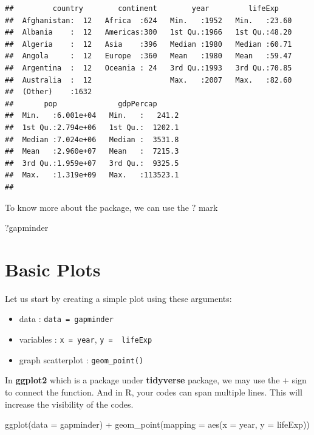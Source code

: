 \documentclass[
  10pt,
]{krantz}
\newenvironment{Shaded}{\begin{snugshade}}{\end{snugshade}}
\newcommand{\AttributeTok}[1]{\textcolor[rgb]{0.77,0.63,0.00}{#1}}
\newcommand{\FunctionTok}[1]{\textcolor[rgb]{0.00,0.00,0.00}{#1}}
\newcommand{\NormalTok}[1]{#1}
\newcommand{\SpecialCharTok}[1]{\textcolor[rgb]{0.00,0.00,0.00}{#1}}
\providecommand{\tightlist}{%
  \setlength{\itemsep}{0pt}\setlength{\parskip}{0pt}}
\begin{document}
\begin{verbatim}
##         country        continent        year         lifeExp     
##  Afghanistan:  12   Africa  :624   Min.   :1952   Min.   :23.60  
##  Albania    :  12   Americas:300   1st Qu.:1966   1st Qu.:48.20  
##  Algeria    :  12   Asia    :396   Median :1980   Median :60.71  
##  Angola     :  12   Europe  :360   Mean   :1980   Mean   :59.47  
##  Argentina  :  12   Oceania : 24   3rd Qu.:1993   3rd Qu.:70.85  
##  Australia  :  12                  Max.   :2007   Max.   :82.60  
##  (Other)    :1632                                                
##       pop              gdpPercap       
##  Min.   :6.001e+04   Min.   :   241.2  
##  1st Qu.:2.794e+06   1st Qu.:  1202.1  
##  Median :7.024e+06   Median :  3531.8  
##  Mean   :2.960e+07   Mean   :  7215.3  
##  3rd Qu.:1.959e+07   3rd Qu.:  9325.5  
##  Max.   :1.319e+09   Max.   :113523.1  
## 
\end{verbatim}

To know more about the package, we can use the \(?\) mark

\begin{Shaded}
\begin{Highlighting}[]
\NormalTok{?gapminder}
\end{Highlighting}
\end{Shaded}

\hypertarget{basic-plots}{%
\section{\texorpdfstring{Basic Plots}{Basic Plots}}\label{basic-plots}}

Let us start by creating a simple plot using these arguments:

\begin{itemize}
\tightlist
\item
  data : \texttt{data\ =\ gapminder}
\item
  variables : \texttt{x\ =\ year}, \texttt{y\ =\ \ lifeExp}
\item
  graph scatterplot : \texttt{geom\_point()}
\end{itemize}

In \textbf{ggplot2} which is a package under \textbf{tidyverse} package, we may use the \(+\) sign to connect the function. And in R, your codes can span multiple lines. This will increase the visibility of the codes.

\begin{Shaded}
\begin{Highlighting}[]
\FunctionTok{ggplot}\NormalTok{(}\AttributeTok{data =}\NormalTok{ gapminder) }\SpecialCharTok{+}
  \FunctionTok{geom\_point}\NormalTok{(}\AttributeTok{mapping =} \FunctionTok{aes}\NormalTok{(}\AttributeTok{x =}\NormalTok{ year, }\AttributeTok{y =}\NormalTok{ lifeExp))}
\end{Highlighting}
\end{Shaded}
\end{document}
